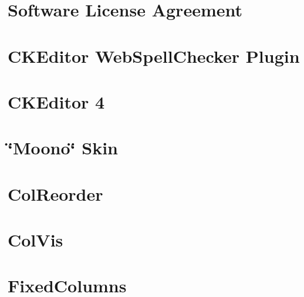 \let\mypdfximage\pdfximage\def\pdfximage{\immediate\mypdfximage}\documentclass[twoside]{book}
\newcommand{\+}{\discretionary{\mbox{\scriptsize$\hookleftarrow$}}{}{}}
\begin{document}
\chapter{Software License Agreement}
\label{md_res_plugins_ckeditor_plugins_wsc__l_i_c_e_n_s_e}

\chapter{C\+K\+Editor Web\+Spell\+Checker Plugin}
\label{md_res_plugins_ckeditor_plugins_wsc__r_e_a_d_m_e}

\chapter{C\+K\+Editor 4}
\label{md_res_plugins_ckeditor__r_e_a_d_m_e}

\chapter{\char`\"{}\+Moono\char`\"{} Skin}
\label{md_res_plugins_ckeditor_skins_moono_readme}

\chapter{Col\+Reorder}
\label{md_res_plugins_datatables_extensions__col_reorder__readme}

\chapter{Col\+Vis}
\label{md_res_plugins_datatables_extensions__col_vis__readme}

\chapter{Fixed\+Columns}
\label{md_res_plugins_datatables_extensions__fixed_columns__readme}

\end{document}
